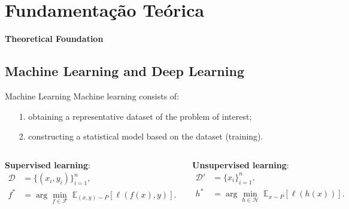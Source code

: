 \documentclass[aspectratio=169,xcolor=dvipsnames]{beamer}
\begin{document}
\section{Fundamentação Teórica}

\begin{frame}  %
    \Large{\centerline{\textbf{Theoretical Foundation}}}
\end{frame}

\subsection{Machine Learning and Deep Learning}
\begin{frame}{Machine Learning}
    Machine learning consists of:
    \begin{itemize}
        \item[1.] obtaining a representative dataset of the problem of interest;
        \item[2.] constructing a statistical model based on the dataset (training).
    \end{itemize}

    \begin{columns}[c]
        {\small
            \textbf{Supervised learning}:
            \begin{align*}
                \mathcal{D} & = \{(x_i, y_i)\}_{i=1}^n,                                                 \\
                f^*         & = \arg\min_{f \in \mathcal{F}} \; \mathbb{E}_{(x,y)\sim P}[\ell(f(x),y)].
            \end{align*}

            \textbf{Unsupervised learning}:
            \begin{align*}
                \mathcal{D}' & = \{x_i\}_{i=1}^n,                                                  \\
                h^*          & = \arg\min_{h \in \mathcal{H}} \; \mathbb{E}_{x\sim P}[\ell(h(x))].
            \end{align*}
        }


\end{columns}
\end{frame}
\end{document}
